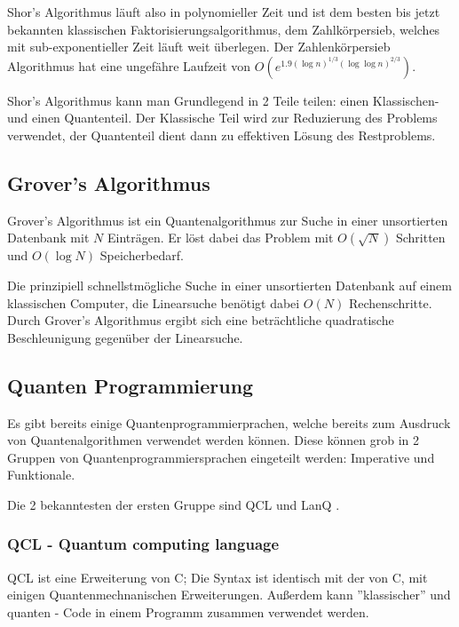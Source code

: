 Shor's Algorithmus läuft also in polynomieller Zeit und ist dem besten bis jetzt bekannten klassischen Faktorisierungsalgorithmus, dem Zahlkörpersieb, welches mit sub-exponentieller Zeit läuft weit überlegen.
Der Zahlenkörpersieb Algorithmus hat eine ungefähre Laufzeit von $O(e^{1.9 (\log{n})^{1/3} (\log{\log{n}})^{2/3}})$. \cite{numberfieldsieve}


Shor's Algorithmus kann man Grundlegend in 2 Teile teilen: einen Klassischen- und einen Quantenteil.
Der Klassische Teil wird zur Reduzierung des Problems verwendet, der Quantenteil dient dann zu effektiven Lösung des Restproblems.


\subsection{Grover's Algorithmus}
\label{sec:Grover's Algorithmus}

Grover's Algorithmus ist ein Quantenalgorithmus zur Suche in einer unsortierten Datenbank mit $N$ Einträgen. Er löst dabei das Problem mit $O(\sqrt{N})$ Schritten und $O(\log N)$ Speicherbedarf.

Die prinzipiell schnellstmögliche Suche in einer unsortierten Datenbank auf einem klassischen Computer, die Linearsuche benötigt dabei $O(N)$ Rechenschritte.
Durch Grover's Algorithmus ergibt sich eine beträchtliche quadratische Beschleunigung gegenüber der Linearsuche.


\subsection{Quanten Programmierung}
\label{sec:Quanten Programmierung}

Es gibt bereits einige Quantenprogrammierprachen, welche bereits zum Ausdruck von Quantenalgorithmen verwendet werden können.
Diese können grob in 2 Gruppen von Quantenprogrammiersprachen eingeteilt werden: Imperative und Funktionale.

Die 2 bekanntesten der ersten Gruppe sind QCL \cite{qcl} und LanQ \cite{lanq}.


\subsubsection{QCL - Quantum computing language}
\label{sec:QCL - Quantum computing language}

QCL ist eine Erweiterung von C; Die Syntax ist identisch mit der von C, mit einigen Quantenmechnanischen Erweiterungen.
Außerdem kann ''klassischer'' und quanten - Code in einem Programm zusammen verwendet werden.

